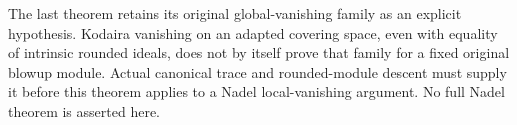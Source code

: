 The last theorem retains its original global-vanishing family as an
explicit hypothesis. Kodaira vanishing on an adapted covering space,
even with equality of intrinsic rounded ideals, does not by itself prove
that family for a fixed original blowup module. Actual canonical trace
and rounded-module descent must supply it before this theorem applies
to a Nadel local-vanishing argument. No full Nadel theorem is asserted here.
